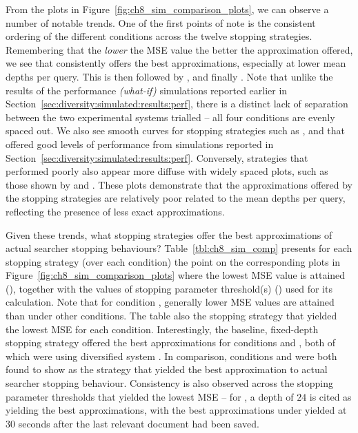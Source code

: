 From the plots in Figure~\ref{fig:ch8_sim_comparison_plots}, we can observe a number of notable trends. One of the first points of note is the consistent ordering of the different conditions across the twelve stopping strategies. Remembering that the \emph{lower} the MSE value the better the approximation offered, we see that  consistently offers the best approximations, especially at lower mean depths per query. This is then followed by ,  and finally . Note that unlike the results of the performance \emph{(what-if)} simulations reported earlier in Section~\ref{sec:diversity:simulated:results:perf}, there is a distinct lack of separation between the two experimental systems trialled -- all four conditions are evenly spaced out. We also see smooth curves for stopping strategies such as ,  and  that offered good levels of performance from simulations reported in Section~\ref{sec:diversity:simulated:results:perf}. Conversely, strategies that performed poorly also appear more diffuse with widely spaced plots, such as those shown by  and . These plots demonstrate that the approximations offered by the stopping strategies are relatively poor related to the mean depths per query, reflecting the presence of less exact approximations.

Given these trends, what stopping strategies offer the best approximations of actual searcher stopping behaviours? Table~\ref{tbl:ch8_sim_comp} presents for each stopping strategy (over each condition) the point on the corresponding plots in Figure~\ref{fig:ch8_sim_comparison_plots} where the lowest MSE value is attained (), together with the values of stopping parameter threshold(s) () used for its calculation. Note that for condition , generally lower MSE values are attained than under other conditions. The table also  the stopping strategy that yielded the lowest MSE for each condition. Interestingly, the baseline, fixed-depth stopping strategy  offered the best approximations for conditions  and , both of which were using diversified system . In comparison, conditions  and  were both found to show  as the strategy that yielded the best approximation to actual searcher stopping behaviour. Consistency is also observed across the stopping parameter thresholds that yielded the lowest MSE -- for , a depth of $24$ is cited as yielding the best approximations, with the best approximations under  yielded at $30$ seconds after the last relevant document had been saved.

